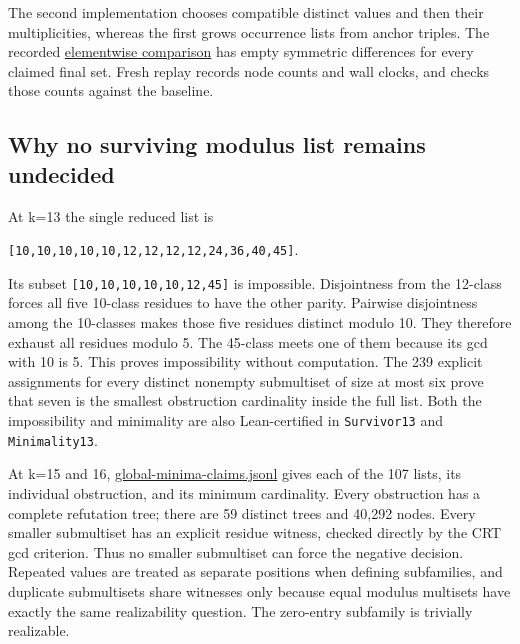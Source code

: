 \documentclass[11pt,a4paper]{article}
\begin{document}
The second implementation chooses compatible distinct values and then their multiplicities, whereas the first grows occurrence lists from anchor triples. The recorded \href{https://github.com/mpelteshki/climbing-to-the-frontier/blob/212bba53b1818c08c40b8c4b48f636651eaf6410/cagent/p4/audit/compare-independent-9-16.jsonl}{elementwise comparison} has empty symmetric differences for every claimed final set. Fresh replay records node counts and wall clocks, and checks those counts against the baseline.

\subsection{Why no surviving modulus list remains undecided}\label{why-no-surviving-modulus-list-remains-undecided}

At k=13 the single reduced list is

\texttt{{[}10,10,10,10,10,12,12,12,12,24,36,40,45{]}}.

Its subset \texttt{{[}10,10,10,10,10,12,45{]}} is impossible. Disjointness from the 12-class forces all five 10-class residues to have the other parity. Pairwise disjointness among the 10-classes makes those five residues distinct modulo 10. They therefore exhaust all residues modulo 5. The 45-class meets one of them because its gcd with 10 is 5. This proves impossibility without computation. The 239 explicit assignments for every distinct nonempty submultiset of size at most six prove that seven is the smallest obstruction cardinality inside the full list. Both the impossibility and minimality are also Lean-certified in \texttt{Survivor13} and \texttt{Minimality13}.

At k=15 and 16, \href{https://github.com/mpelteshki/climbing-to-the-frontier/blob/212bba53b1818c08c40b8c4b48f636651eaf6410/cagent/p4/audit/global-minima-claims.jsonl}{global-minima-claims.jsonl} gives each of the 107 lists, its individual obstruction, and its minimum cardinality. Every obstruction has a complete refutation tree; there are 59 distinct trees and 40,292 nodes. Every smaller submultiset has an explicit residue witness, checked directly by the CRT gcd criterion. Thus no smaller submultiset can force the negative decision. Repeated values are treated as separate positions when defining subfamilies, and duplicate submultisets share witnesses only because equal modulus multisets have exactly the same realizability question. The zero-entry subfamily is trivially realizable.
\end{document}
